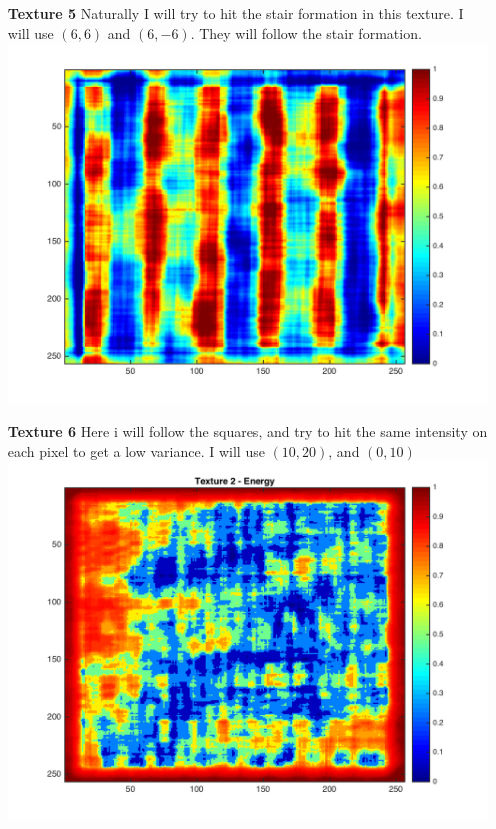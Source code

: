\documentclass{article}
\begin{document}
\begin{itemize}
\item[\textbf{Texture 5}]
Naturally I will try to hit the stair formation in this texture. I will use $(6, 6)$ and $(6, -6)$. They will follow the stair formation. 
\\
\includegraphics[totalheight=5cm]{t5plot.png}

\item[\textbf{Texture 6}]
Here i will follow the squares, and try to hit the same intensity on each pixel to get a low variance. I will use $(10, 20)$, and $(0, 10)$\\
\includegraphics[totalheight=5cm]{t6plot.png}


\end{itemize}
\end{document}
